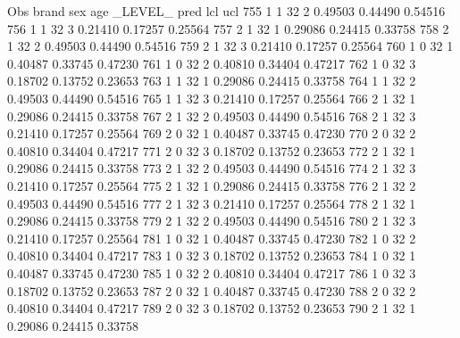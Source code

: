 \documentclass{article}
\begin{document}
\begin{Woutput}
 Obs    brand    sex    age    _LEVEL_      pred       lcl        ucl
 755      1       1      32       2       0.49503    0.44490    0.54516
 756      1       1      32       3       0.21410    0.17257    0.25564
 757      2       1      32       1       0.29086    0.24415    0.33758
 758      2       1      32       2       0.49503    0.44490    0.54516
 759      2       1      32       3       0.21410    0.17257    0.25564
 760      1       0      32       1       0.40487    0.33745    0.47230
 761      1       0      32       2       0.40810    0.34404    0.47217
 762      1       0      32       3       0.18702    0.13752    0.23653
 763      1       1      32       1       0.29086    0.24415    0.33758
 764      1       1      32       2       0.49503    0.44490    0.54516
 765      1       1      32       3       0.21410    0.17257    0.25564
 766      2       1      32       1       0.29086    0.24415    0.33758
 767      2       1      32       2       0.49503    0.44490    0.54516
 768      2       1      32       3       0.21410    0.17257    0.25564
 769      2       0      32       1       0.40487    0.33745    0.47230
 770      2       0      32       2       0.40810    0.34404    0.47217
 771      2       0      32       3       0.18702    0.13752    0.23653
 772      2       1      32       1       0.29086    0.24415    0.33758
 773      2       1      32       2       0.49503    0.44490    0.54516
 774      2       1      32       3       0.21410    0.17257    0.25564
 775      2       1      32       1       0.29086    0.24415    0.33758
 776      2       1      32       2       0.49503    0.44490    0.54516
 777      2       1      32       3       0.21410    0.17257    0.25564
 778      2       1      32       1       0.29086    0.24415    0.33758
 779      2       1      32       2       0.49503    0.44490    0.54516
 780      2       1      32       3       0.21410    0.17257    0.25564
 781      1       0      32       1       0.40487    0.33745    0.47230
 782      1       0      32       2       0.40810    0.34404    0.47217
 783      1       0      32       3       0.18702    0.13752    0.23653
 784      1       0      32       1       0.40487    0.33745    0.47230
 785      1       0      32       2       0.40810    0.34404    0.47217
 786      1       0      32       3       0.18702    0.13752    0.23653
 787      2       0      32       1       0.40487    0.33745    0.47230
 788      2       0      32       2       0.40810    0.34404    0.47217
 789      2       0      32       3       0.18702    0.13752    0.23653
 790      2       1      32       1       0.29086    0.24415    0.33758

\end{Woutput}
\end{document}
